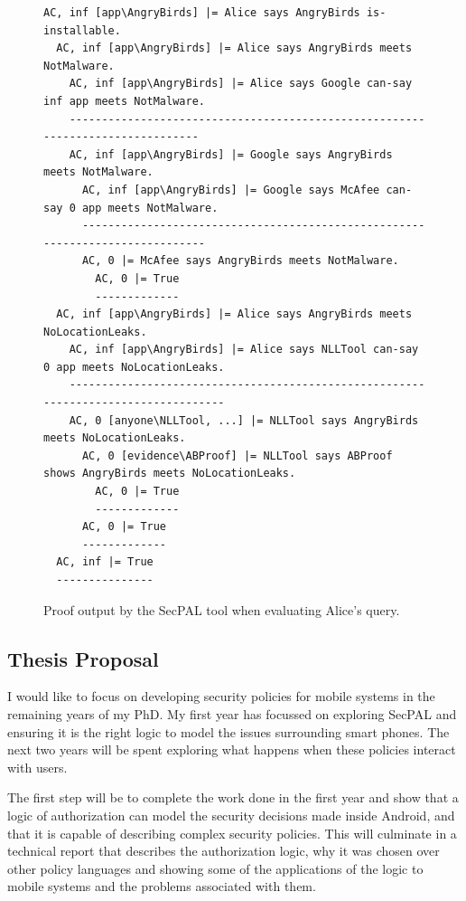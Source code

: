 \documentclass[a4paper,12pt,sfsidenotes]{tufte-book}
\begin{document}
\begin{figure}\label{secpal:exampleproof}
  \begin{lstlisting}[basicstyle=\small\ttfamily,columns=flexible,mathescape]
AC, inf [app\AngryBirds] |= Alice says AngryBirds is-installable.
  AC, inf [app\AngryBirds] |= Alice says AngryBirds meets NotMalware.
    AC, inf [app\AngryBirds] |= Alice says Google can-say inf app meets NotMalware.
    -------------------------------------------------------------------------------
    AC, inf [app\AngryBirds] |= Google says AngryBirds meets NotMalware.
      AC, inf [app\AngryBirds] |= Google says McAfee can-say 0 app meets NotMalware.
      ------------------------------------------------------------------------------
      AC, 0 |= McAfee says AngryBirds meets NotMalware.
        AC, 0 |= True
        -------------
  AC, inf [app\AngryBirds] |= Alice says AngryBirds meets NoLocationLeaks.
    AC, inf [app\AngryBirds] |= Alice says NLLTool can-say 0 app meets NoLocationLeaks.
    -----------------------------------------------------------------------------------
    AC, 0 [anyone\NLLTool, ...] |= NLLTool says AngryBirds meets NoLocationLeaks.
      AC, 0 [evidence\ABProof] |= NLLTool says ABProof shows AngryBirds meets NoLocationLeaks.
        AC, 0 |= True
        -------------
      AC, 0 |= True
      -------------
  AC, inf |= True
  ---------------
  \end{lstlisting}
  \caption{Proof output by the SecPAL tool when evaluating Alice's query.}
\end{figure}

\subsection{Thesis Proposal}

I would like to focus on developing security policies for mobile systems in the
remaining years of my PhD.  My first year has focussed on exploring SecPAL
and ensuring it is the right logic to model the issues surrounding smart phones.
The next two years will be spent exploring what happens when these policies
interact with users.

The first step will be to complete the work done in the first year and show that
a logic of authorization can model the security decisions made inside Android,
and that it is capable of describing complex security policies.  This will
culminate in a technical report that describes the authorization logic, why it
was chosen over other policy languages and showing some of the applications of
the logic to mobile systems and the problems associated with them.
\end{document}
